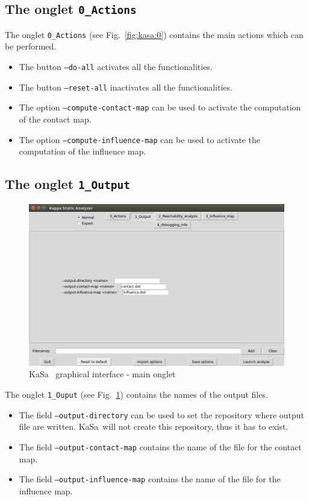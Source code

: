 \documentclass[11pt]{book}
\def\KaSa{\textsf{KaSa}}
\begin{document}
\subsection{The onglet \texttt{0\_Actions}}

The onglet \texttt{0\_Actions} (see Fig.~\ref{fig:kasa:0}) contains the main actions which can be performed. 

\begin{itemize}
\item The button \texttt{--do-all} activates all the functionalities. 
\item The button \texttt{--reset-all} inactivates all the functionalities.
\item The option \texttt{--compute-contact-map} can be used to activate the computation of the contact map. 
\item The option \texttt{--compute-influence-map} can be used to activate the computation of the influence map.
\end{itemize}

\subsection{The onglet \texttt{1\_Output}}

\begin{figure}[htbp]
\centering
\includegraphics[width=12cm,natwidth=920pt,natheight=582pt]{img/kasa_1.png}
\caption{\KaSa~ graphical interface - main onglet}
\label{fig:kasa:1}
\end{figure}


The onglet \texttt{1\_Ouput} (see Fig.~\ref{fig:kasa:1}) contains the names of the output files. 

\begin{itemize}
\item The field \texttt{--output-directory} can be used to set the repository where output file are written. \KaSa~will not create this repository, thus it has to exist. 
\item The field \texttt{--output-contact-map} contains the name of the file for the contact map. 
\item The field \texttt{--output-influence-map} contains the name of the file for the influence map. 
\end{itemize}
\end{document}
